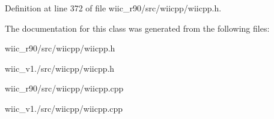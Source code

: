 Definition at line 372 of file wiic\-\_\-r90/src/wiicpp/wiicpp.\-h.



The documentation for this class was generated from the following files\-:\begin{DoxyCompactItemize}
\item 
wiic\-\_\-r90/src/wiicpp/wiicpp.\-h\item 
wiic\-\_\-v1./src/wiicpp/wiicpp.\-h\item 
wiic\-\_\-r90/src/wiicpp/wiicpp.\-cpp\item 
wiic\-\_\-v1./src/wiicpp/wiicpp.\-cpp\end{DoxyCompactItemize}
